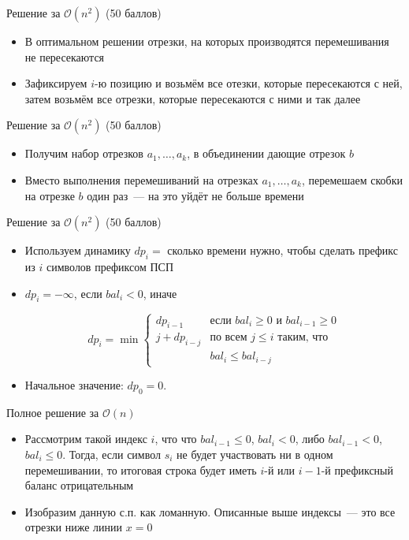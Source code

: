 \begin{frame}{Решение за $\mathcal{O}(n^2)$ (50 баллов)}
  \begin{itemize}
  \item В оптимальном решении отрезки, на которых производятся перемешивания не пересекаются
  \item Зафиксируем $i$-ю позицию и возьмём все отезки, которые пересекаются с ней, затем возьмём все отрезки, которые пересекаются с ними и так далее

  \end{itemize}
\end{frame}



\begin{frame}{Решение за $\mathcal{O}(n^2)$ (50 баллов)}
  \begin{itemize}

  \item Получим набор отрезков $a_1,\dots,a_k$, в объединении дающие отрезок $b$
  \item Вместо выполнения перемешиваний на отрезках $a_1,\dots,a_k$, перемешаем скобки на отрезке $b$ один раз~--- на это уйдёт не больше времени
  \end{itemize}
\end{frame}

\begin{frame}{Решение за $\mathcal{O}(n^2)$ (50 баллов)}
  \begin{itemize}
  \item Используем динамику $dp_i=$ сколько времени нужно, чтобы сделать префикс из $i$ символов префиксом ПСП
  \item $dp_i = -\infty$, если $bal_i < 0$, иначе

  \[ dp_i = \min \left\{
\begin{array}{ll}
dp_{i-1} & \textrm{если } bal_i \geq 0 \textrm{ и } bal_{i-1} \geq 0 \\
j + dp_{i-j} & \textrm{по всем } j \leq i \textrm{ таким, что } \\
& bal_i \leq bal_{i-j}
\end{array} \right. \]
  \item Начальное значение: $dp_0 = 0$. 
  \end{itemize}
\end{frame}

\begin{frame}{Полное решение за $\mathcal{O}(n)$}
  \begin{itemize}
  \item Рассмотрим такой индекс $i$, что что $bal_{i-1} \leq 0$, $bal_{i} < 0$, либо $bal_{i-1} < 0$, $bal_i \leq 0$. Тогда, если символ $s_i$ не будет участвовать ни в одном перемешивании, то итоговая строка будет иметь $i$-й или $i-1$-й префиксный баланс отрицательным
  \item Изобразим данную с.п. как ломанную. Описанные выше индексы~--- это все отрезки ниже линии $x=0$
  \end{itemize}
\end{frame} 

